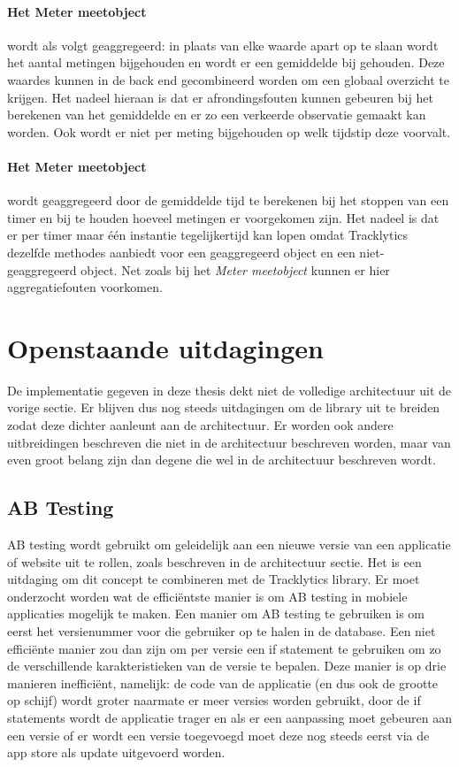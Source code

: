 \paragraph{Het Meter meetobject} wordt als volgt geaggregeerd: in plaats van elke waarde apart op te slaan wordt het aantal metingen bijgehouden en wordt er een gemiddelde bij gehouden. Deze waardes kunnen in de back end gecombineerd worden om een globaal overzicht te krijgen. Het nadeel hieraan is dat er afrondingsfouten kunnen gebeuren bij het berekenen van het gemiddelde en er zo een verkeerde observatie gemaakt kan worden. Ook wordt er niet per meting bijgehouden op welk tijdstip deze voorvalt. \\

\paragraph{Het Meter meetobject} wordt geaggregeerd door de gemiddelde tijd te berekenen bij het stoppen van een timer en bij te houden hoeveel metingen er voorgekomen zijn. Het nadeel is dat er per timer maar \'e\'en instantie tegelijkertijd kan lopen omdat Tracklytics dezelfde methodes aanbiedt voor een geaggregeerd object en een niet-geaggregeerd object. Net zoals bij het \textit{Meter meetobject} kunnen er hier aggregatiefouten voorkomen. \\



\section{Openstaande uitdagingen}
De implementatie gegeven in deze thesis dekt niet de volledige architectuur uit de vorige sectie. Er blijven dus nog steeds uitdagingen om de library uit te breiden zodat deze dichter aanleunt aan de architectuur. Er worden ook andere uitbreidingen beschreven die niet in de architectuur beschreven worden, maar van even groot belang zijn dan degene die wel in de architectuur beschreven wordt. 

\subsection{AB Testing}
AB testing wordt gebruikt om geleidelijk aan een nieuwe versie van een applicatie of website uit te rollen, zoals beschreven in de architectuur sectie. Het is een uitdaging om dit concept te combineren met de Tracklytics library. Er moet onderzocht worden wat de effici\"entste manier is om AB testing in mobiele applicaties mogelijk te maken.  Een manier om AB testing te gebruiken is om eerst het versienummer voor die gebruiker op te halen in de database. Een niet effici\"ente manier zou dan zijn om per versie een if statement te gebruiken om zo de verschillende karakteristieken van de versie te bepalen. Deze manier is op drie manieren ineffici\"ent, namelijk: de code van de applicatie (en dus ook de grootte op schijf) wordt groter naarmate er meer versies worden gebruikt, door de if statements wordt de applicatie trager en als er een aanpassing moet gebeuren aan een versie of er wordt een versie toegevoegd moet deze nog steeds eerst via de app store als update uitgevoerd worden.


